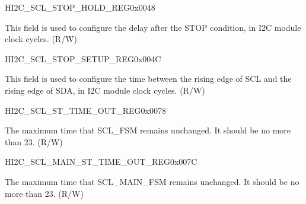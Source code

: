 \begin{register}{H}{I2C\_SCL\_STOP\_HOLD\_REG}{0x0048}\label{regdesc:I2CSCLSTOPHOLDREG}
%
%
\regnewline%
\begin{regdesc}\begin{reglist}
\label{fielddesc:I2CSCLSTOPHOLDTIME}\item [I2C\_SCL\_STOP\_HOLD\_TIME] This field is used to configure the delay after the STOP condition,
in I2C module clock cycles. (R/W)
\end{reglist}\end{regdesc}
\end{register}


\begin{register}{H}{I2C\_SCL\_STOP\_SETUP\_REG}{0x004C}\label{regdesc:I2CSCLSTOPSETUPREG}
%
%
\regnewline%
\begin{regdesc}\begin{reglist}
\label{fielddesc:I2CSCLSTOPSETUPTIME}\item [I2C\_SCL\_STOP\_SETUP\_TIME] This field is used to configure the time between the rising edge
of SCL and the rising edge of SDA, in I2C module clock cycles. (R/W)
\end{reglist}\end{regdesc}
\end{register}


\begin{register}{H}{I2C\_SCL\_ST\_TIME\_OUT\_REG}{0x0078}\label{regdesc:I2CSCLSTTIMEOUTREG}
%
%
\regnewline%
\begin{regdesc}\begin{reglist}
\label{fielddesc:I2CSCLSTTOI2C}\item [I2C\_SCL\_ST\_TO\_I2C] The maximum time that SCL\_FSM remains unchanged. It should be no more than 23. (R/W)
\end{reglist}\end{regdesc}
\end{register}


\begin{register}{H}{I2C\_SCL\_MAIN\_ST\_TIME\_OUT\_REG}{0x007C}\label{regdesc:I2CSCLMAINSTTIMEOUTREG}
%
%
\regnewline%
\begin{regdesc}\begin{reglist}
\label{fielddesc:I2CSCLMAINSTTOI2C}\item [I2C\_SCL\_MAIN\_ST\_TO\_I2C] The maximum time that SCL\_MAIN\_FSM remains unchanged. It should be no more than 23. (R/W)
\end{reglist}\end{regdesc}
\end{register}


